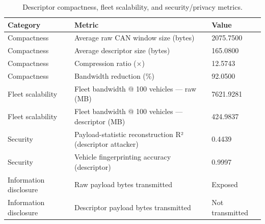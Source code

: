 \begin{table}[t]
\centering
\begin{tabular}{lll}
\toprule
Category & Metric & Value \\
\midrule
Compactness & Average raw CAN window size (bytes) & 2075.7500 \\
Compactness & Average descriptor size (bytes) & 165.0800 \\
Compactness & Compression ratio (×) & 12.5743 \\
Compactness & Bandwidth reduction (\%) & 92.0500 \\
Fleet scalability & Fleet bandwidth @ 100 vehicles — raw (MB) & 7621.9281 \\
Fleet scalability & Fleet bandwidth @ 100 vehicles — descriptor (MB) & 424.9837 \\
Security & Payload-statistic reconstruction R² (descriptor attacker) & 0.4439 \\
Security & Vehicle fingerprinting accuracy (descriptor) & 0.9997 \\
Information disclosure & Raw payload bytes transmitted & Exposed \\
Information disclosure & Descriptor payload bytes transmitted & Not transmitted \\
\bottomrule
\end{tabular}
\caption{Descriptor compactness, fleet scalability, and security/privacy metrics.}
\label{tab:descriptor-security}
\end{table}
